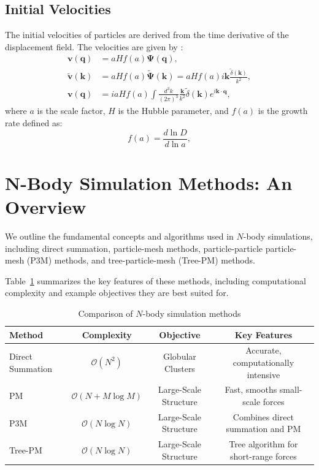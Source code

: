 \subsection{Initial Velocities}
The initial velocities of particles are derived from the time derivative of the displacement field. The velocities are given by \citep{1985ApJS...57..241E}:
\begin{align}
    \mathbf{v}(\mathbf{q}) &= a H f(a) \boldsymbol{\Psi}(\mathbf{q}), \\
    \tilde{\mathbf{v}}(\mathbf{k}) &= a H f(a) \tilde{\boldsymbol{\Psi}}(\mathbf{k}) = a H f(a) i \mathbf{k} \frac{\tilde{\delta}(\mathbf{k})}{k^2}, \\
    \mathbf{v}(\mathbf{q}) &= i a H f(a) \int \frac{d^3k}{(2\pi)^3} \frac{\mathbf{k}}{k^2} \tilde{\delta}(\mathbf{k}) e^{i\mathbf{k} \cdot \mathbf{q}},
\end{align}
where $a$ is the scale factor, $H$ is the Hubble parameter, and $f(a)$ is the growth rate defined as:
\begin{equation}
    f(a) = \frac{d\ln D}{d\ln a},
\end{equation}

\section[N-Body Simulation Methods]{N-Body Simulation Methods: An Overview}
We outline the fundamental concepts and algorithms used in $N$-body simulations, including direct summation, particle-mesh methods, particle-particle particle-mesh (P3M) methods, and tree-particle-mesh (Tree-PM) methods.

Table~\ref{tab:simulation-methods} summarizes the key features of these methods, including computational complexity and example objectives they are best suited for.

\begin{table}[ht]
    \centering
    \begin{tabular}{lccc}
        \toprule
        \textbf{Method} & \textbf{Complexity} & \textbf{Objective} & \textbf{Key Features} \\
        \midrule
        Direct Summation & $\mathcal{O}(N^2)$ & Globular Clusters & Accurate, computationally intensive \\
        PM & $\mathcal{O}(N + M \log M)$ & Large-Scale Structure & Fast, smooths small-scale forces \\
        P3M & $\mathcal{O}(N \log N)$ & Large-Scale Structure & Combines direct summation and PM \\
        Tree-PM & $\mathcal{O}(N \log N)$ & Large-Scale Structure & Tree algorithm for short-range forces \\
        \bottomrule
    \end{tabular}
    \caption{Comparison of $N$-body simulation methods}
    \label{tab:simulation-methods}
\end{table}

